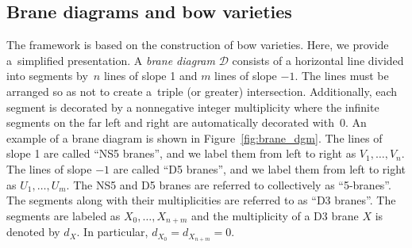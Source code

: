 \documentclass[11pt]{article}
\numberwithin{equation}{section}
\newcommand{\brane}{\mathcal D}
\begin{document}
\subsection{Brane diagrams and bow varieties}
The \cite{RS} framework is based on the \cite{NT} construction of bow varieties. Here, we provide a~simplified presentation. A \textit{brane diagram} $\brane$ consists of a horizontal line divided into segments by~$n$ lines of slope 1 and $m$ lines of slope $-1$. The lines must be arranged so as not to create a~triple (or greater) intersection. Additionally, each segment is decorated by a nonnegative integer multiplicity where the infinite segments on the far left and right are automatically decorated with~0. An example of a brane diagram is shown in Figure~\ref{fig:brane_dgm}. The lines of slope 1 are called ``NS5 branes'', and we label them from left to right as $V_1, \dots , V_n$. The lines of slope $-1$ are called ``D5 branes'', and we label them from left to right as $U_1, \dots , U_m$. The NS5 and D5 branes are referred to collectively as ``5-branes''. The segments along with their multiplicities are referred to as ``D3 branes''. The segments are labeled as $X_0, \dots , X_{n + m}$ and the multiplicity of a D3 brane $X$ is denoted by $d_X$. In particular, $d_{X_0} = d_{X_{n + m}} = 0$.
\end{document}
